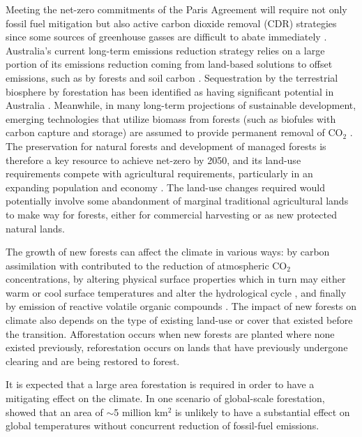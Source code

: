 \documentclass[]{article}
\begin{document}
Meeting the net-zero commitments of the Paris Agreement will require not only fossil fuel mitigation but also active carbon dioxide removal (CDR) strategies since some sources of greenhouse gasses are difficult to abate immediately \parencite{van_vuuren_rcp26_2011, vaughan_review_2011, rogelj_emission_2011}.
Australia's current long-term emissions reduction strategy relies on a large portion of its emissions reduction coming from land-based solutions to offset emissions, such as by forests and soil carbon \parencite{smith_longterm_2022, australian_government_2021}.
Sequestration by the terrestrial biosphere by forestation has been identified as having significant potential in Australia \parencite{fitch_australias_2022}.
Meanwhile, in many long-term projections of sustainable development, emerging technologies that utilize biomass from forests (such as biofules with carbon capture and storage) are assumed to provide permanent removal of CO$_2$ \parencite{pour_opportunities_2018}.
The preservation for natural forests and development of managed forests is therefore a key resource to achieve net-zero by 2050, and its land-use requirements compete with agricultural requirements, particularly in an expanding population and economy \parencite{fitch_australias_2022}.
The land-use changes required would potentially involve some abandonment of marginal traditional agricultural lands to make way for forests, either for commercial harvesting or as new protected natural lands.

The growth of new forests can affect the climate in various ways: by carbon assimilation with contributed to the reduction of atmospheric CO$_2$ concentrations, by altering physical surface properties which in turn may either warm or cool surface temperatures and alter the hydrological cycle \parencite{pongratz_biogeophysical_2010}, and finally by emission of reactive volatile organic compounds \parencite{weber_chemistry_albedo_2024}. The impact of new forests on climate also depends on the type of existing land-use or cover that existed before the transition. Afforestation occurs when new forests are planted where none existed previously, reforestation occurs on lands that have previously undergone clearing and are being restored to forest.

It is expected that a large area forestation is required in order to have a mitigating effect on the climate.
In one scenario of global-scale forestation, \cite{loughran_limited_2023} showed that an area of $\sim$5 million km$^2$ is unlikely to have a substantial effect on global temperatures without concurrent reduction of fossil-fuel emissions.
\end{document}
